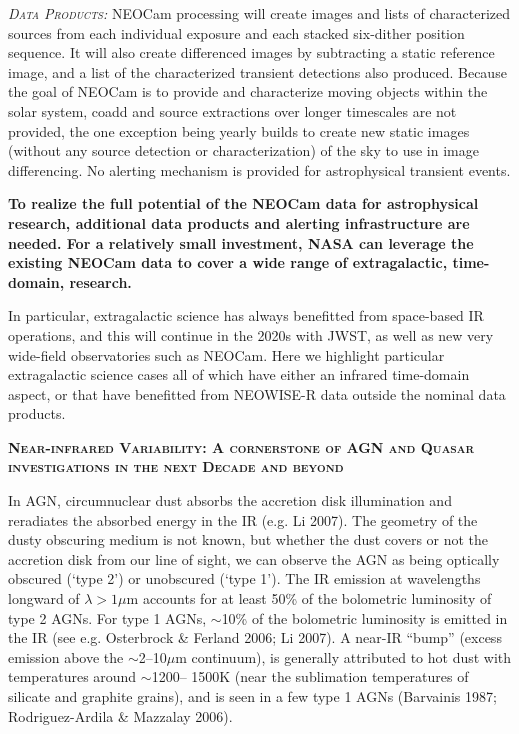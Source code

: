 \documentclass[12pt]{article}
\begin{document}
\smallskip
\smallskip
\noindent
\textsl{\textsc{Data Products:}} NEOCam processing will create images and lists of characterized sources from each individual exposure and each stacked six-dither position sequence. It will also create differenced images by subtracting a static reference image, and a list of the characterized transient detections also produced. Because the goal of NEOCam is to provide and characterize moving objects within the solar system, coadd and source extractions over longer timescales are not provided, the one exception being yearly builds to create new static images (without any source detection or characterization) of the sky to use in image differencing. No alerting mechanism is provided for astrophysical transient events.  

\smallskip
\smallskip
\noindent
{\bf To realize the full potential of the NEOCam data for
astrophysical research, additional data products and alerting
infrastructure are needed. For a relatively small investment, NASA can
leverage the existing NEOCam data to cover a wide range of
extragalactic, time-domain, research.}

\smallskip
\smallskip
\noindent
In particular, extragalactic science has always benefitted from
space-based IR operations, and this will continue in the 2020s with
JWST, as well as new very wide-field observatories such as
NEOCam. Here we highlight particular extragalactic science cases all
of which have either an infrared time-domain aspect, or that have
benefitted from NEOWISE-R data outside the nominal data products.


\smallskip
\smallskip
\noindent
{\bfseries \textsc{\textcolor{Cerulean}{
Near-infrared Variability: A cornerstone of AGN and Quasar investigations in the next Decade and beyond
}}}


\smallskip
\smallskip
\noindent
In AGN, circumnuclear dust absorbs the accretion disk illumination and
reradiates the absorbed energy in the IR (e.g. Li 2007). The geometry
of the dusty obscuring medium is not known, but whether the dust
covers or not the accretion disk from our line of sight, we can
observe the AGN as being optically obscured (`type 2') or unobscured
(`type 1'). The IR emission at wavelengths longward of $\lambda > 1
\mu$m accounts for at least 50\% of the bolometric luminosity of type
2 AGNs. For type 1 AGNs, $\sim$10\% of the bolometric luminosity is
emitted in the IR (see e.g. Osterbrock \& Ferland 2006; Li 2007). A
near-IR ``bump'' (excess emission above the $\sim$2–10$\mu$m
continuum), is generally attributed to hot dust with temperatures
around $\sim$1200– 1500K (near the sublimation temperatures of
silicate and graphite grains), and is seen in a few type 1 AGNs
(Barvainis 1987; Rodriguez-Ardila \& Mazzalay 2006).
\end{document}
